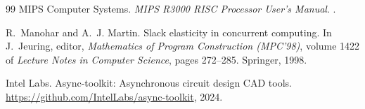 \documentclass[11pt]{article}
\begin{document}
\begin{thebibliography}{99}
MIPS Computer Systems.
\newblock \emph{MIPS R3000 RISC Processor User's Manual}.
.

R.~Manohar and A.~J. Martin.
\newblock Slack elasticity in concurrent computing.
\newblock In J.~Jeuring, editor, \emph{Mathematics of Program Construction
  (MPC'98)}, volume 1422 of \emph{Lecture Notes in Computer Science},
  pages 272--285. Springer, 1998.

Intel Labs.
\newblock Async-toolkit: Asynchronous circuit design CAD tools.
\newblock \url{https://github.com/IntelLabs/async-toolkit}, 2024.

\end{thebibliography}
\end{document}
